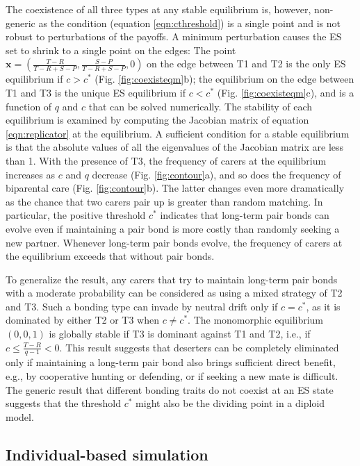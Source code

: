 \documentclass[12pt]{article}
\begin{document}
The coexistence of all three types at any stable equilibrium is, however, non-generic as the condition (equation \eqref{eqn:cthreshold}) is a single point and is not robust to perturbations of the payoffs. A minimum perturbation causes the ES set to shrink to a single point on the edges: The point $\mathbf{x}=(\tfrac{T-R}{T-R+S-P}, \tfrac{S-P}{T-R+S-P},0)$ on the edge between T1 and T2 is the only ES equilibrium if $c>c^*$ (Fig. \ref{fig:coexisteqm}b); the equilibrium on the edge between T1 and T3 is the unique ES equilibrium if $c<c^*$ (Fig. \ref{fig:coexisteqm}c), and is a function of $q$ and $c$ that can be solved numerically. The stability of each equilibrium is examined by computing the Jacobian matrix of equation \eqref{eqn:replicator} at the equilibrium. A sufficient condition for a stable equilibrium is that the absolute values of all the eigenvalues of the Jacobian matrix are less than 1. With the presence of T3, the frequency of carers at the equilibrium increases as $c$ and $q$ decrease (Fig. \ref{fig:contour}a), and so does the frequency of biparental care (Fig. \ref{fig:contour}b). The latter changes even more dramatically as the chance that two carers pair up is greater than random matching. In particular, the positive threshold $c^*$ indicates that long-term pair bonds can evolve even if maintaining a pair bond is more costly than randomly seeking a new partner. Whenever long-term pair bonds evolve, the frequency of carers at the equilibrium exceeds that without pair bonds.

To generalize the result, any carers that try to maintain long-term pair bonds with a moderate probability can be considered as using a mixed strategy of T2 and T3. Such a bonding type can invade by neutral drift only if $c=c^*$, as it is dominated by either T2 or T3 when $c \neq c^*$. The monomorphic equilibrium $(0, 0, 1)$ is globally stable if T3 is dominant against T1 and T2, i.e., if $c \leq \tfrac{T-R}{q-1} <0$. This result suggests that deserters can be completely eliminated only if maintaining a long-term pair bond also brings sufficient direct benefit, e.g., by cooperative hunting or defending, or if seeking a new mate is difficult. The generic result that different bonding traits do not coexist at an ES state suggests that the threshold $c^*$ might also be the dividing point in a diploid model.

\subsection*{Individual-based simulation}
\end{document}
